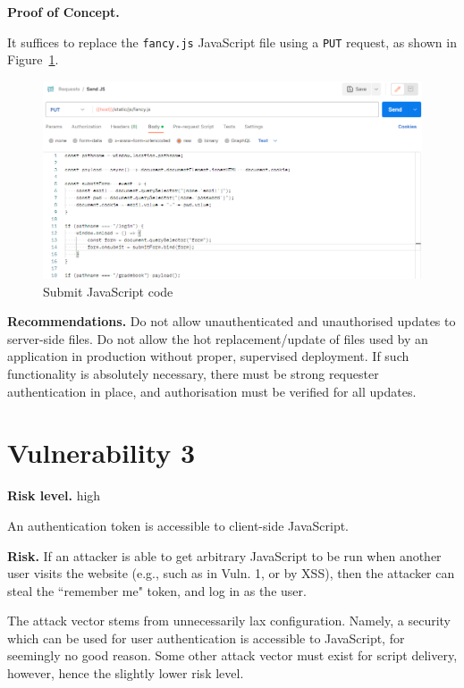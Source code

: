 \documentclass[parskip=half]{scrartcl}
\newcommand{\figref}[1]{Figure~\ref{#1}}
\begin{document}
\textbf{Proof of Concept.}

It suffices to replace the \texttt{fancy.js} JavaScript file using a
\texttt{PUT} request, as shown in \figref{fig:submitjs}.

\begin{figure}[h]
    \centering
    \includegraphics[width=\textwidth]{submit_js}
    \caption{Submit JavaScript code}
    \label{fig:submitjs}
\end{figure}

\textbf{Recommendations.} Do not allow unauthenticated and unauthorised updates
to server-side files. Do not allow the hot replacement/update of files used by
an application in production without proper, supervised deployment. If such
functionality is absolutely necessary, there must be strong requester
authentication in place, and authorisation must be verified for all updates.

\clearpage
\newpage

\section*{Vulnerability 3}\label{vuln3}

\textbf{Risk level.} high

An authentication token is accessible to client-side JavaScript.

\textbf{Risk.} If an attacker is able to get arbitrary JavaScript to be run
when another user visits the website (e.g., such as in Vuln. 1, or by
XSS), then the attacker can steal the ``remember me" token, and log in as the
user.

The attack vector stems from unnecessarily lax configuration. Namely, a
security which can be used for user authentication is accessible to JavaScript,
for seemingly no good reason. Some other attack vector must exist for script
delivery, however, hence the slightly lower risk level.
\end{document}
